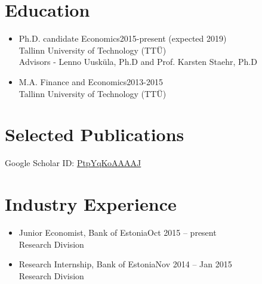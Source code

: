 \documentclass[11pt,letter,sans]{moderncv}
\begin{document}
\hypersetup{linkcolor=color0,urlcolor=color1}
\makecvtitle

\vspace{-7mm}
\section{Education}
\begin{itemize}\item Ph.D. candidate Economics\hfill 2015-present (expected 2019) \\
     Tallinn University of Technology (TTÜ) \\
   Advisors - Lenno Uusküla, Ph.D and Prof. Karsten Staehr, Ph.D
\item M.A. Finance and Economics\hfill 2013-2015 \\
     Tallinn University of Technology (TTÜ) \\
\end{itemize}


\section{Selected Publications}
\vspace{-7.5mm}
\hfill
Google Scholar ID:
\href{https://scholar.google.com/citations?user=PtpYqKoAAAAJ}{PtpYqKoAAAAJ}
\vspace{2mm}

\renewcommand*{\bibfont}{\small}

\begin{refsection}
\nocite{*}
\printbibliography[heading=none,prefixnumbers=,type=article]
\end{refsection}


\section{Industry Experience}
  \begin{itemize}
      \item Junior Economist, Bank of Estonia\hfill Oct 2015 -- present \\
        Research Division

      \item Research Internship, Bank of Estonia\hfill Nov 2014 -- Jan 2015 \\
        Research Division

  \end{itemize}
\end{document}
